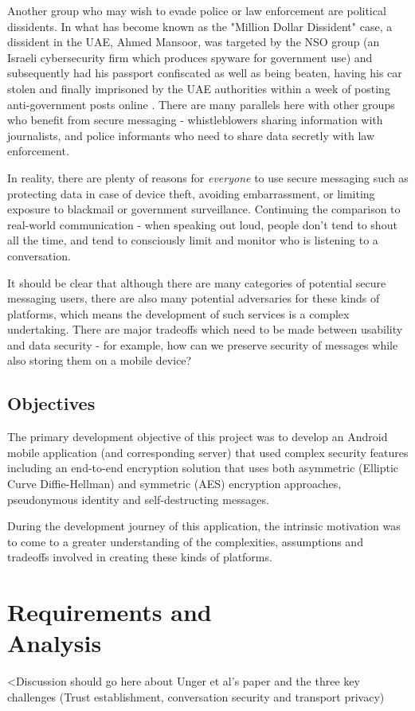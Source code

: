 \documentclass{mproj}
\begin{document}
Another group who may wish to evade police or law enforcement are political dissidents. In what has become known as the "Million Dollar Dissident" \cite{marczak2018hide} case, a dissident in the UAE, Ahmed Mansoor, was targeted by the NSO group (an Israeli cybersecurity firm which produces spyware for government use) and subsequently had his passport confiscated as well as being beaten, having his car stolen and finally imprisoned by the UAE authorities within a week of posting anti-government posts online \cite{mazzetti2019new}. There are many parallels here with other groups who benefit from secure messaging - whistleblowers sharing information with journalists, and police informants who need to share data secretly with law enforcement. 

In reality, there are plenty of reasons for \emph{everyone} to use secure messaging such as protecting data in case of device theft, avoiding embarrassment, or limiting exposure to blackmail or government surveillance. Continuing the comparison to real-world communication - when speaking out loud, people don't tend to shout all the time, and tend to consciously limit and monitor who is listening to a conversation.

It should be clear that although there are many categories of potential secure messaging users, there are also many potential adversaries for these kinds of platforms, which means the development of such services is a complex undertaking. There are major tradeoffs which need to be made between usability and data security - for example, how can we preserve security of messages while also storing them on a mobile device? 

\section{Objectives}
The primary development objective of this project was to develop an Android mobile application (and corresponding server) that used complex security features including an end-to-end encryption solution that uses both asymmetric (Elliptic Curve Diffie-Hellman) and symmetric (AES) encryption approaches, pseudonymous identity and self-destructing messages. 

During the development journey of this application, the intrinsic motivation was to come to a greater understanding of the complexities, assumptions and tradeoffs involved in creating these kinds of platforms. 

\chapter{Requirements and \\ Analysis}\label{analysis}
<Discussion should go here about Unger et al's paper and the three key challenges (Trust establishment, conversation security and transport privacy)\cite{unger2015sok}
\end{document}
